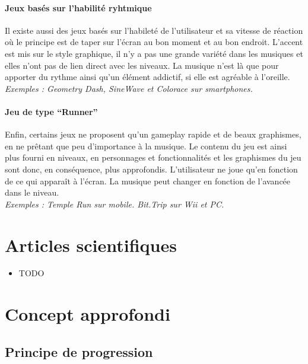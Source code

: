 \documentclass[a4paper,11pt]{article}
\begin{document}
\paragraph{Jeux basés sur l’habilité ryhtmique}
Il existe aussi des jeux basés sur l’habileté de l’utilisateur et sa vitesse de réaction où le principe est de taper sur l’écran au bon moment et au bon endroit. L'accent est mis sur le style graphique, il n'y a pas une grande variété dans les musiques et elles n'ont pas de lien direct avec les niveaux. La musique n'est là que pour apporter du rythme ainsi qu’un élément addictif, si elle est agréable à l’oreille.\\
\textit{Exemples : Geometry Dash, SineWave et Colorace sur smartphones.}
\paragraph{Jeu de type “Runner”}
Enfin, certains jeux ne proposent qu’un gameplay rapide et de beaux graphismes, en ne prêtant que peu d’importance à la musique. Le contenu du jeu est ainsi plus fourni en niveaux, en personnages et fonctionnalités et les graphismes du jeu sont donc, en conséquence, plus approfondis. L’utilisateur ne joue qu’en fonction de ce qui apparaît à l’écran. La musique peut changer en fonction de l’avancée dans le niveau.\\
\textit{Exemples : Temple Run sur mobile. Bit.Trip sur Wii et PC.}

\section{Articles scientifiques}
\begin{itemize}
\item TODO
\end{itemize}


\section{Concept approfondi}
\subsection{Principe de progression}
\end{document}
